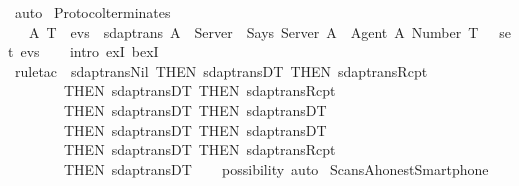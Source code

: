 \begin{isabellebody}
  \ {\isacharparenleft}auto{\isacharparenright}\isanewline
  \isamarkupfalse%
  \endisatagproof
  {\isafoldproof}%
  \isadelimproof
  \endisadelimproof
  \isadelimdocument
  \endisadelimdocument
  \isatagdocument
  \isamarkuptrue%
  \endisatagdocument
  {\isafolddocument}%
  \isadelimdocument
  \endisadelimdocument
  \isamarkupfalse%
  \ Protocol{\isacharunderscore}terminates\ {\isacharcolon}\isanewline
  \ \ {\isachardoublequoteopen}{\isasymexists}\ A\ T{\isachardot}\ {\isasymexists}\ evs\ {\isasymin}\ sdaptrans{\isachardot}\ A\ {\isasymnoteq}\ Server\ {\isasymand}\ Says\ Server\ A\ {\isasymlbrace}\ Agent\ A{\isacharcomma}\ Number\ T\ {\isasymrbrace}\ {\isasymin}\ set\ evs{\isachardoublequoteclose}\isanewline
  \isadelimproof
  \isanewline
  \ \ %
  \endisadelimproof
  \isatagproof
  \isamarkupfalse%
  \ {\isacharparenleft}intro\ exI\ bexI{\isacharparenright}\isanewline
  \ \ \isamarkupfalse%
  \ {\isacharparenleft}rule{\isacharunderscore}tac\ {\isacharbrackleft}{}{\isacharbrackright}\ sdaptrans{\isachardot}Nil\ {\isacharbrackleft}THEN\ sdaptrans{\isachardot}DT{}{\isacharcomma}\ THEN\ sdaptrans{\isachardot}Rcpt{\isacharcomma}\isanewline
  \ \ \ \ \ \ \ \ THEN\ sdaptrans{\isachardot}DT{}{\isacharcomma}\ THEN\ sdaptrans{\isachardot}Rcpt{\isacharcomma}\isanewline
  \ \ \ \ \ \ \ \ THEN\ sdaptrans{\isachardot}DT{}{\isacharcomma}\ THEN\ sdaptrans{\isachardot}DT{}{\isacharcomma}\ \isanewline
  \ \ \ \ \ \ \ \ THEN\ sdaptrans{\isachardot}DT{}{\isacharcomma}\ THEN\ sdaptrans{\isachardot}DT{}{\isacharcomma}\ \isanewline
  \ \ \ \ \ \ \ \ THEN\ sdaptrans{\isachardot}DT{}{\isacharcomma}\ THEN\ sdaptrans{\isachardot}Rcpt{\isacharcomma}\isanewline
  \ \ \ \ \ \ \ \ THEN\ sdaptrans{\isachardot}DT{}{\isacharbrackright}{\isacharparenright}\isanewline
  \ \ \isamarkupfalse%
  \ {\isacharparenleft}possibility{\isacharcomma}\ auto{\isacharparenright}\isanewline
  \isamarkupfalse%
  \endisatagproof
  {\isafoldproof}%
  \isadelimproof
  \endisadelimproof
  \isadelimdocument
  \endisadelimdocument
  \isatagdocument
  \isamarkuptrue%
  \endisatagdocument
  {\isafolddocument}%
  \isadelimdocument
  \endisadelimdocument
  \isamarkupfalse%
  \ Scans{\isacharunderscore}A{\isacharunderscore}honest{\isacharunderscore}Smartphone{\isacharunderscore}{}\ {\isacharcolon}\isanewline

\end{isabellebody}
